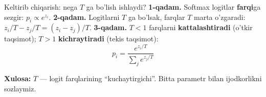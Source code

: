 \documentclass[aspectratio=169,11pt]{beamer}
\begin{document}
\begin{frame}{Keltirib chiqarish: nega $T$ ga bo'lish ishlaydi?}
  \textbf{1-qadam.} Softmax logitlar \textbf{farqi}ga sezgir: $p_i\propto e^{z_i}$.
  \pause
  \textbf{2-qadam.} Logitlarni $T$ ga bo'lsak, farqlar $T$ marta o'zgaradi:
  $z_i/T - z_j/T = (z_i - z_j)/T$.
  \pause
  \textbf{3-qadam.} $T<1$ farqlarni \textbf{kattalashtiradi} (o'tkir taqsimot);
  $T>1$ \textbf{kichraytiradi} (tekis taqsimot):
  $$ p_i = \frac{e^{z_i/T}}{\sum_j e^{z_j/T}} $$
  \begin{tcolorbox}[okbox,top=2pt,bottom=2pt]
    \small \textbf{Xulosa:} $T$ --- logit farqlarining ``kuchaytirgichi''. Bitta
    parametr bilan ijodkorlikni sozlaymiz.
  \end{tcolorbox}
\end{frame}
\end{document}
